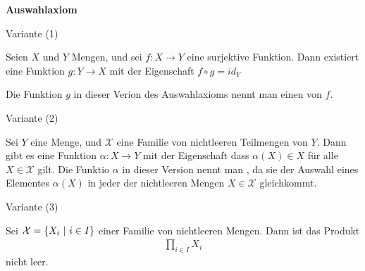 \vspace{1\baselineskip}

\textbf{Auswahlaxiom}

\vspace{1\baselineskip}

Variante (1)

Seien $X$ und $Y$ Mengen, und sei $f:X \rightarrow Y$ eine surjektive
Funktion. Dann existiert eine Funktion $g:Y \rightarrow X$ mit der 
Eigenschaft $f \circ g = id_Y$

Die Funktion $g$ in dieser Verion des Auswahlaxioms nennt man einen
 von $f$. 

\vspace{1\baselineskip}

Variante (2)

Sei $Y$ eine Menge, und $\mathcal{X}$ eine Familie von nichtleeren Teilmengen von $Y$.
Dann gibt es eine Funktion $\alpha : X \rightarrow Y$ mit der Eigenschaft
dass $\alpha(X) \in X$ für alle $X \in \mathcal{X}$ gilt.
Die Funktio $\alpha$ in dieser Version nennt man , 
da sie der Auswahl eines Elementes $\alpha(X)$ in jeder der nichtleeren 
Mengen $X \in \mathcal{X}$ gleichkommt. 

\pagebreak

Variante (3)

Sei $\mathcal{X} = \left\{ X_i \ | \ i \in I \right\}$ einer Familie von 
nichtleeren Mengen. Dann ist das Produkt
\begin{align*}
    \prod_{i \in I} X_i
\end{align*}
nicht leer.

\vspace{1\baselineskip}


\vspace{1\baselineskip}


